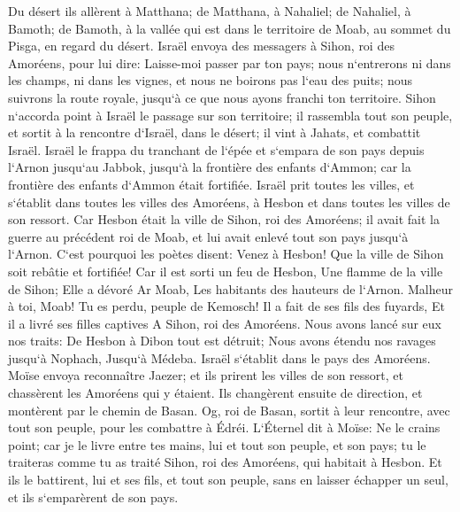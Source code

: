 \verse Du désert ils allèrent à Matthana; de Matthana, à Nahaliel; de Nahaliel, à Bamoth; 
\verse de Bamoth, à la vallée qui est dans le territoire de Moab, au sommet du Pisga, en regard du désert. 
\verse Israël envoya des messagers à Sihon, roi des Amoréens, pour lui dire: 
\verse Laisse-moi passer par ton pays; nous n`entrerons ni dans les champs, ni dans les vignes, et nous ne boirons pas l`eau des puits; nous suivrons la route royale, jusqu`à ce que nous ayons franchi ton territoire. 
\verse Sihon n`accorda point à Israël le passage sur son territoire; il rassembla tout son peuple, et sortit à la rencontre d`Israël, dans le désert; il vint à Jahats, et combattit Israël. 
\verse Israël le frappa du tranchant de l`épée et s`empara de son pays depuis l`Arnon jusqu`au Jabbok, jusqu`à la frontière des enfants d`Ammon; car la frontière des enfants d`Ammon était fortifiée. 
\verse Israël prit toutes les villes, et s`établit dans toutes les villes des Amoréens, à Hesbon et dans toutes les villes de son ressort. 
\verse Car Hesbon était la ville de Sihon, roi des Amoréens; il avait fait la guerre au précédent roi de Moab, et lui avait enlevé tout son pays jusqu`à l`Arnon. 
\verse C`est pourquoi les poètes disent: Venez à Hesbon! Que la ville de Sihon soit rebâtie et fortifiée! 
\verse Car il est sorti un feu de Hesbon, Une flamme de la ville de Sihon; Elle a dévoré Ar Moab, Les habitants des hauteurs de l`Arnon. 
\verse Malheur à toi, Moab! Tu es perdu, peuple de Kemosch! Il a fait de ses fils des fuyards, Et il a livré ses filles captives A Sihon, roi des Amoréens. 
\verse Nous avons lancé sur eux nos traits: De Hesbon à Dibon tout est détruit; Nous avons étendu nos ravages jusqu`à Nophach, Jusqu`à Médeba. 
\verse Israël s`établit dans le pays des Amoréens. 
\verse Moïse envoya reconnaître Jaezer; et ils prirent les villes de son ressort, et chassèrent les Amoréens qui y étaient. 
\verse Ils changèrent ensuite de direction, et montèrent par le chemin de Basan. Og, roi de Basan, sortit à leur rencontre, avec tout son peuple, pour les combattre à Édréi. 
\verse L`Éternel dit à Moïse: Ne le crains point; car je le livre entre tes mains, lui et tout son peuple, et son pays; tu le traiteras comme tu as traité Sihon, roi des Amoréens, qui habitait à Hesbon. 
\verse Et ils le battirent, lui et ses fils, et tout son peuple, sans en laisser échapper un seul, et ils s`emparèrent de son pays. 

